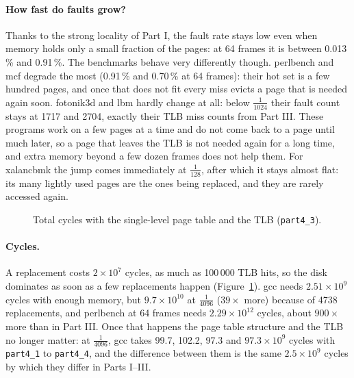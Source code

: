 \documentclass[11pt,a4paper]{article}
\newcommand{\addbench}[1]{%
  \addplot table[x index=0, y=blender]{#1}; \addplot table[x index=0, y=fotonik3d]{#1};
  \addplot table[x index=0, y=gcc]{#1};     \addplot table[x index=0, y=imagick]{#1};
  \addplot table[x index=0, y=lbm]{#1};     \addplot table[x index=0, y=mcf]{#1};
  \addplot table[x index=0, y=perlbench]{#1}; \addplot table[x index=0, y=x264]{#1};
  \addplot table[x index=0, y=xalancbmk]{#1}; \addplot table[x index=0, y=xz]{#1};
  \legend{blender,fotonik3d,gcc,imagick,lbm,mcf,perlbench,x264,xalancbmk,xz}}
\begin{document}
\paragraph{How fast do faults grow?} Thanks to the strong locality of Part I, the fault rate stays
low even when memory holds only a small fraction of the pages: at 64 frames it is between 0.013\,\%
and 0.91\,\%. The benchmarks behave very differently though. perlbench and mcf degrade the most
(0.91\,\% and 0.70\,\% at 64 frames): their hot set is a few hundred pages, and once that does not
fit every miss evicts a page that is needed again soon. fotonik3d and lbm hardly change at all:
below $\frac{1}{1024}$ their fault count stays at 1717 and 2704, exactly their TLB miss counts from
Part III. These programs work on a few pages at a time and do not come back to a page until much
later, so a page that leaves the TLB is not needed again for a long time, and extra memory beyond
a few dozen frames does not help them. For xalancbmk the jump comes immediately at
$\frac{1}{128}$, after which it stays almost flat: its many lightly used pages are the ones being
replaced, and they are rarely accessed again.

\begin{figure}[H]
\centering
{}
\caption{Total cycles with the single-level page table and the TLB (\texttt{part4\_3}).}
\label{fig:cycles}
\end{figure}

\paragraph{Cycles.} A replacement costs $2\times10^{7}$ cycles, as much as 100\,000 TLB hits, so
the disk dominates as soon as a few replacements happen (Figure~\ref{fig:cycles}). gcc needs
$2.51\times10^{9}$ cycles with enough memory, but $9.7\times10^{10}$ at $\frac{1}{4096}$
($39\times$ more) because of 4738 replacements, and perlbench at 64 frames needs
$2.29\times10^{12}$ cycles, about $900\times$ more than in Part III. Once that happens the page
table structure and the TLB no longer matter: at $\frac{1}{4096}$, gcc takes 99.7, 102.2, 97.3
and $97.3\times10^{9}$ cycles with \texttt{part4\_1} to \texttt{part4\_4}, and the difference
between them is the same $2.5\times10^{9}$ cycles by which they differ in Parts I--III.
\end{document}
